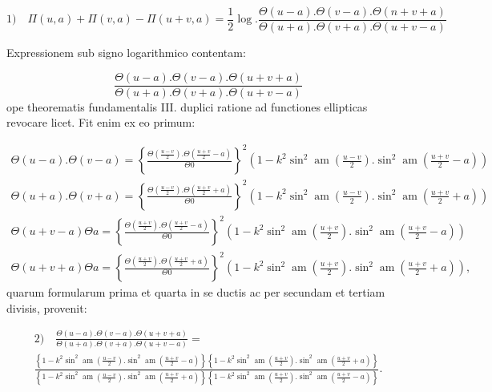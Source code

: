 \documentclass{article}
\begin{document}
\[
\text{1)}\quad \Pi(u,a)+\Pi(v,a)-\Pi(u+v,a)=\frac{1}{2}\log.\frac{\Theta(u-a).\Theta(v-a).\Theta(n+v+a)}{\Theta(u+a).\Theta(v+a).\Theta(u+v-a)}
\]

Expressionem sub signo logarithmico contentam:

\[
\frac{\Theta(u-a).\Theta(v-a).\Theta(u+v+a)}{\Theta(u+a).\Theta(v+a).\Theta(u+v-a)}
\]
ope theorematis fundamentalis III. duplici ratione ad functiones ellipticas revocare licet. Fit enim ex eo primum:

\[
\begin{gathered}
\Theta(u-a).\Theta(v-a)=\left\{\frac{\Theta\left(\frac{u-v}{2}\right).\Theta\left(\frac{u+v}{2}-a\right)}{\Theta0}\right\}^{2}\left(1-k^{2}\sin^{2}\operatorname{am}\left(\frac{u-v}{2}\right).\sin^{2}\operatorname{am}\left(\frac{u+v}{2}-a\right)\right)\\[2ex]
\Theta(u+a).\Theta(v+a)=\left\{\frac{\Theta\left(\frac{u-v}{2}\right).\Theta\left(\frac{u+v}{2}+a\right)}{\Theta0}\right\}^{2}\left(1-k^{2}\sin^{2}\operatorname{am}\left(\frac{u-v}{2}\right).\sin^{2}\operatorname{am}\left(\frac{u+v}{2}+a\right)\right)\\[2ex]
\Theta(u+v-a)\Theta a=\left\{\frac{\Theta\left(\frac{u+v}{2}\right).\Theta\left(\frac{u+v}{2}-a\right)}{\Theta0}\right\}^{2}\left(1-k^{2}\sin^{2}\operatorname{am}\left(\frac{u+v}{2}\right).\sin^{2}\operatorname{am}\left(\frac{u+v}{2}-a\right)\right)\\[2ex]
\Theta(u+v+a)\Theta a=\left\{\frac{\Theta\left(\frac{u+v}{2}\right).\Theta\left(\frac{u+v}{2}+a\right)}{\Theta0}\right\}^{2}\left(1-k^{2}\sin^{2}\operatorname{am}\left(\frac{u+v}{2}\right).\sin^{2}\operatorname{am}\left(\frac{u+v}{2}+a\right)\right),
\end{gathered}
\]
quarum formularum prima et quarta in se ductis ac per secundam et tertiam divisis, provenit:

\[
\begin{gathered}
\text{2)}\quad \frac{\Theta(u-a).\Theta(v-a).\Theta(u+v+a)}{\Theta(u+a).\Theta(v+a).\Theta(u+v-a)}=\\[1.5ex]
\frac{\left\{1-k^{2}\sin^{2}\operatorname{am}\left(\frac{u-v}{2}\right).\sin^{2}\operatorname{am}\left(\frac{u+v}{2}-a\right)\right\}\left\{1-k^{2}\sin^{2}\operatorname{am}\left(\frac{u+v}{2}\right).\sin^{2}\operatorname{am}\left(\frac{u+v}{2}+a\right)\right\}}{\left\{1-k^{2}\sin^{2}\operatorname{am}\left(\frac{u-v}{2}\right).\sin^{2}\operatorname{am}\left(\frac{u+v}{2}+a\right)\right\}\left\{1-k^{2}\sin^{2}\operatorname{am}\left(\frac{u+v}{2}\right).\sin^{2}\operatorname{am}\left(\frac{u+v}{2}-a\right)\right\}}.
\end{gathered}
\]
\end{document}
